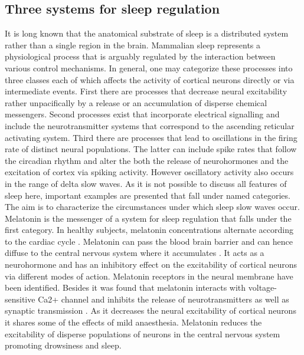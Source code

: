 \subsection{Three systems for sleep regulation}
It is long known that the anatomical substrate of sleep is a distributed system rather than a single region in the brain\parencite{akert1965anatomical}. Mammalian sleep represents a physiological process that is arguably regulated by the interaction between various control mechanisms. In general, one may categorize these processes into three classes each of which affects the activity of cortical neurons directly or via intermediate events. First there are processes that decrease neural excitability rather unpacifically by a release or an accumulation of disperse chemical messengers. Second processes exist that incorporate electrical signalling and include the neurotransmitter systems that correspond to the ascending reticular activating system. Third there are processes that lead to oscillations in the firing rate of distinct neural populations. The latter can include spike rates that follow the circadian rhythm and alter the both the release of neurohormones and the excitation of cortex via spiking activity. However oscillatory activity also occurs in the range of delta slow waves. As it is not possible to discuss all features of sleep here, important examples are presented that fall under named categories. The aim is to characterize the circumstances under which sleep slow waves occur.\\
Melatonin is the messenger of a system for sleep regulation that falls under the first category. In healthy subjects, melatonin concentrations alternate according to the cardiac cycle \parencite{montagna2005fatal}. Melatonin can pass the blood brain barrier and can hence diffuse to the central nervous system where it accumulates \parencite{aulinas2019physiology}. It acts as a neurohormone and has an inhibitory effect on the excitability of cortical neurons via different modes of action. Melatonin receptors in the neural membrane have been identified. Besides it was found that melatonin interacts with voltage-sensitive Ca2+ channel and inhibits the release of neurotransmitters as well as synaptic transmission \parencite{choi2014melatonin}. As it decreases the neural excitability of cortical neurons it shares some of the effects of mild anaesthesia. Melatonin reduces the excitability of disperse populations of neurons in the central nervous system promoting drowsiness and sleep. \\
